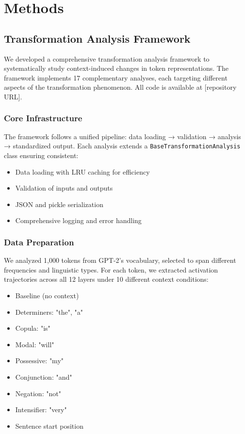 
\section{Methods}

\subsection{Transformation Analysis Framework}

We developed a comprehensive transformation analysis framework to systematically study context-induced changes in token representations. The framework implements 17 complementary analyses, each targeting different aspects of the transformation phenomenon. All code is available at [repository URL].

\subsubsection{Core Infrastructure}

The framework follows a unified pipeline: data loading → validation → analysis → standardized output. Each analysis extends a \texttt{BaseTransformationAnalysis} class ensuring consistent:
\begin{itemize}
\item Data loading with LRU caching for efficiency
\item Validation of inputs and outputs
\item JSON and pickle serialization
\item Comprehensive logging and error handling
\end{itemize}

\subsubsection{Data Preparation}

We analyzed 1,000 tokens from GPT-2's vocabulary, selected to span different frequencies and linguistic types. For each token, we extracted activation trajectories across all 12 layers under 10 different context conditions:
\begin{itemize}
\item Baseline (no context)
\item Determiners: "the", "a"
\item Copula: "is"
\item Modal: "will"
\item Possessive: "my"
\item Conjunction: "and"
\item Negation: "not"
\item Intensifier: "very"
\item Sentence start position
\end{itemize}

